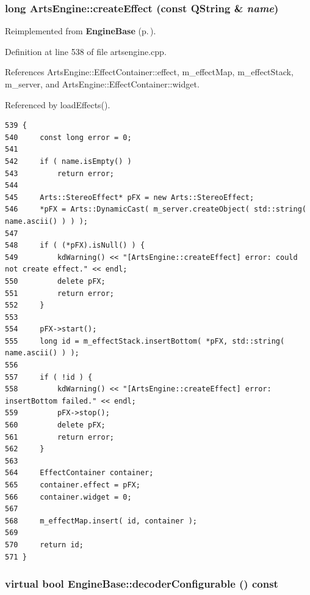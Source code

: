 \subsubsection{\setlength{\rightskip}{0pt plus 5cm}long Arts\-Engine::create\-Effect (const QString \& {\em name})\hspace{0.3cm}{\tt  [virtual]}}\label{classArtsEngine_ArtsEnginea14}




Reimplemented from {\bf Engine\-Base} {\rm (p.\,\pageref{classEngineBase_EngineBasea20})}.

Definition at line 538 of file artsengine.cpp.

References Arts\-Engine::Effect\-Container::effect, m\_\-effect\-Map, m\_\-effect\-Stack, m\_\-server, and Arts\-Engine::Effect\-Container::widget.

Referenced by load\-Effects().



\footnotesize\begin{verbatim}539 {
540     const long error = 0;
541 
542     if ( name.isEmpty() )
543         return error;
544 
545     Arts::StereoEffect* pFX = new Arts::StereoEffect;
546     *pFX = Arts::DynamicCast( m_server.createObject( std::string( name.ascii() ) ) );
547 
548     if ( (*pFX).isNull() ) {
549         kdWarning() << "[ArtsEngine::createEffect] error: could not create effect." << endl;
550         delete pFX;
551         return error;
552     }
553 
554     pFX->start();
555     long id = m_effectStack.insertBottom( *pFX, std::string( name.ascii() ) );
556 
557     if ( !id ) {
558         kdWarning() << "[ArtsEngine::createEffect] error: insertBottom failed." << endl;
559         pFX->stop();
560         delete pFX;
561         return error;
562     }
563 
564     EffectContainer container;
565     container.effect = pFX;
566     container.widget = 0;
567 
568     m_effectMap.insert( id, container );
569 
570     return id;
571 }
\end{verbatim}\normalsize 
{}
\subsubsection{\setlength{\rightskip}{0pt plus 5cm}virtual bool Engine\-Base::decoder\-Configurable () const\hspace{0.3cm}{\tt  [inline, virtual, inherited]}}\label{classEngineBase_EngineBasea23}




